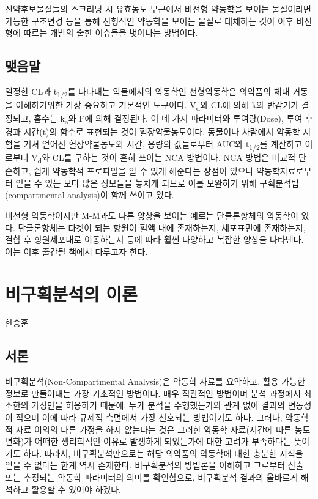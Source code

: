 \documentclass[
  11pt,
  krantz2, a4paper, twoside]{krantz}
\theoremstyle{definition}
\theoremstyle{definition}
\theoremstyle{definition}
\theoremstyle{definition}
\theoremstyle{remark}
\begin{document}
신약후보물질들의 스크리닝 시 유효농도 부근에서 비선형 약동학을 보이는 물질이라면 가능한 구조변경 등을 통해 선형적인 약동학을 보이는 물질로 대체하는 것이 이후 비선형에 따르는 개발의 숱한 이슈들을 벗어나는 방법이다.

\hypertarget{uxb9fauxc74cuxb9d0}{%
\section{맺음말}\label{uxb9fauxc74cuxb9d0}}

일정한 CL과 t\textsubscript{1/2}를 나타내는 약물에서의 약동학인 선형약동학은 의약품의 체내 거동을 이해하기위한 가장 중요하고 기본적인 도구이다. 
V\textsubscript{d}와 CL에 의해 k와 반감기가 결정되고, 흡수는 k\textsubscript{a}와 F에 의해 결정된다. 
이 네 가지 파라미터와 투여량(Dose), 투여 후 경과 시간(t)의 함수로 표현되는 것이 혈장약물농도이다.
동물이나 사람에서 약동학 시험을 거쳐 얻어진 혈장약물농도와 시간, 용량의 값들로부터 AUC와 t\textsubscript{1/2}를 계산하고 이로부터 V\textsubscript{d}와 CL를 구하는 것이 흔히 쓰이는 NCA 방법이다. 
NCA 방법은 비교적 단순하고, 쉽게 약동학적 프로파일을 알 수 있게 해준다는 장점이 있으나 약동학자료로부터 얻을 수 있는 보다 많은 정보들을 놓치게 되므로 이를 보완하기 위해 구획분석법(compartmental analysis)이 함께 쓰이고 있다.

비선형 약동학이지만 M-M과도 다른 양상을 보이는 예로는 단클론항체의 약동학이 있다. 
단클론항체는 타겟이 되는 항원이 혈액 내에 존재하는지, 세포표면에 존재하는지, 결합 후 항원세포내로 이동하는지 등에 따라 훨씬 다양하고 복잡한 양상을 나타낸다. 
이는 이후 출간될 책에서 다루고자 한다.

\hypertarget{uxbe44uxad6cuxd68duxbd84uxc11duxc758-uxc774uxb860}{%
\chapter{비구획분석의 이론}\label{uxbe44uxad6cuxd68duxbd84uxc11duxc758-uxc774uxb860}}

\Large\hfill

한승훈
\normalsize

\hypertarget{uxc11cuxb860-1}{%
\section{서론}\label{uxc11cuxb860-1}}

비구획분석(Non-Compartmental Analysis)은 약동학 자료를 요약하고, 활용 가능한 정보로 만들어내는 가장 기초적인 방법이다. 
매우 직관적인 방법이며 분석 과정에서 최소한의 가정만을 허용하기 때문에, 누가 분석을 수행했는가와 관계 없이 결과의 변동성이 적으며 이에 따라 규제적 측면에서 가장 선호되는 방법이기도 하다.
그러나, 약동학적 자료 이외의 다른 가정을 하지 않는다는 것은 그러한 약동학 자료(시간에 따른 농도 변화)가 어떠한 생리학적인 이유로 발생하게 되었는가에 대한 고려가 부족하다는 뜻이기도 하다. 
따라서, 비구획분석만으로는 해당 의약품의 약동학에 대한 충분한 지식을 얻을 수 없다는 한계 역시 존재한다. 
비구획분석의 방법론을 이해하고 그로부터 산출 또는 추정되는 약동학 파라미터의 의미를 확인함으로, 비구획분석 결과의 올바르게 해석하고 활용할 수 있어야 하겠다.
\end{document}
